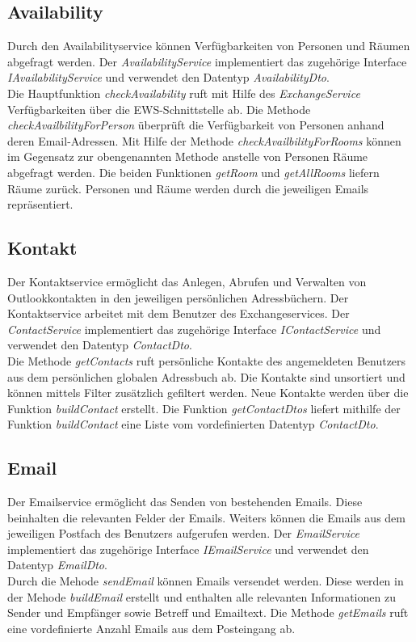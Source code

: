 \subsection{Availability}
Durch den Availabilityservice können Verfügbarkeiten von Personen und Räumen abgefragt werden. Der \textit{AvailabilityService} implementiert das zugehörige Interface \textit{IAvailabilityService} und verwendet den Datentyp \textit{AvailabilityDto}. \\ Die Hauptfunktion \textit{checkAvailability} ruft mit Hilfe des \textit{ExchangeService} Verfügbarkeiten über die EWS-Schnittstelle ab. Die Methode \textit{checkAvailbilityForPerson} überprüft die Verfügbarkeit von  Personen anhand deren Email-Adressen. Mit Hilfe der Methode \textit{checkAvailbilityForRooms} können im Gegensatz zur obengenannten Methode anstelle von Personen Räume abgefragt werden. Die beiden Funktionen \textit{getRoom} und \textit{getAllRooms} liefern Räume zurück.  Personen und Räume werden durch die jeweiligen Emails repräsentiert.
\subsection{Kontakt}
Der Kontaktservice ermöglicht das Anlegen, Abrufen und Verwalten von Outlookkontakten in den jeweiligen persönlichen Adressbüchern. Der Kontaktservice arbeitet mit dem Benutzer des Exchangeservices. Der \textit{ContactService} implementiert das zugehörige Interface \textit{IContactService} und verwendet den Datentyp \textit{ContactDto}.\\ Die Methode \textit{getContacts} ruft persönliche Kontakte des angemeldeten Benutzers aus dem persönlichen globalen Adressbuch ab. Die Kontakte sind unsortiert und können mittels Filter zusätzlich gefiltert werden. Neue Kontakte werden über die Funktion \textit{buildContact} erstellt. Die Funktion \textit{getContactDtos} liefert mithilfe der Funktion \textit{buildContact} eine Liste vom vordefinierten Datentyp \textit{ContactDto}. 
\subsection{Email}
Der Emailservice ermöglicht das Senden von bestehenden Emails. Diese beinhalten die relevanten Felder der Emails. Weiters können die Emails aus dem jeweiligen Postfach des Benutzers aufgerufen werden. Der \textit{EmailService} implementiert das zugehörige Interface \textit{IEmailService} und verwendet den Datentyp \textit{EmailDto}.\\ Durch die Mehode \textit{sendEmail} können Emails versendet werden. Diese werden in der Mehode \textit{buildEmail} erstellt und enthalten alle relevanten Informationen zu Sender und Empfänger sowie Betreff und Emailtext. Die Methode \textit{getEmails} ruft eine vordefinierte Anzahl Emails aus dem Posteingang ab. 
